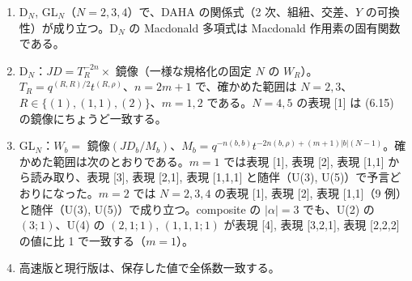\begin{compresult}[検証]\label{cr:daha}
\begin{enumerate}
\item D$_N$, GL$_N$（$N = 2, 3, 4$）で、DAHA の関係式（2 次、組紐、交差、$Y$ の可換性）が成り立つ。D$_N$ の Macdonald 多項式は Macdonald 作用素の固有関数である。
\item D$_N$：$JD = T_R^{-2n}\times$ 鏡像（一様な規格化の固定 $N$ の $W_R$）。$T_R = q^{(R,R)/2}t^{(R,\rho)}$、$n = 2m+1$ で、確かめた範囲は $N = 2, 3$、$R \in \{(1), (1,1), (2)\}$、$m = 1, 2$ である。$N = 4, 5$ の表現 [1] は \cite{AgSc12} (6.15) の鏡像にちょうど一致する。
\item GL$_N$：$W_b = $ 鏡像$(JD_b/M_b)$、$M_b = q^{-n(b,b)}t^{-2n(b,\rho) + (m+1)|b|(N-1)}$。確かめた範囲は次のとおりである。$m = 1$ では表現 [1], 表現 [2], 表現 [1,1] から読み取り、表現 [3], 表現 [2,1], 表現 [1,1,1] と随伴（U(3), U(5)）で予言どおりになった。$m = 2$ では $N = 2, 3, 4$ の表現 [1], 表現 [2], 表現 [1,1]（9 例）と随伴（U(3), U(5)）で成り立つ。composite の $|\alpha| = 3$ でも、U(2) の $(3;1)$、U(4) の $(2,1;1)$, $(1,1,1;1)$ が表現 [4], 表現 [3,2,1], 表現 [2,2,2] の値に比 1 で一致する（$m = 1$）。
\item 高速版と現行版は、保存した値で全係数一致する。
\end{enumerate}
\end{compresult}

